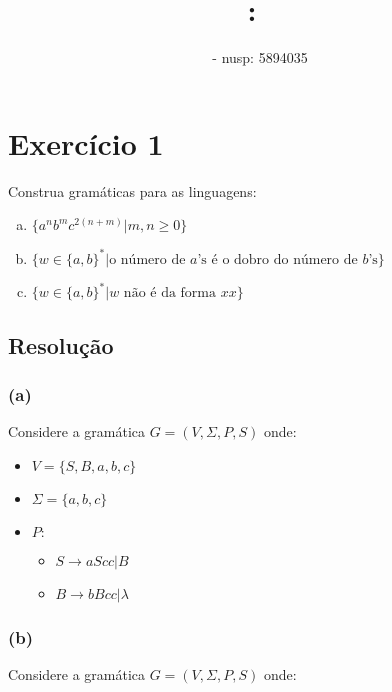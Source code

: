 \documentclass{article}
\title{
\textmd{\textbf{\hmwkClass:\ \hmwkTitle}}\\
}
\author{\textbf{\hmwkAuthorName} - nusp: 5894035}
\date{} %
\begin{document}
\maketitle


\section{Exercício 1}

Construa gramáticas para as linguagens:

\begin{enumerate}[(a)]
	\item $\{a^nb^mc^{2(n+m)}|m,n\geq 0\}$
	\item $\{w\in\{a,b\}^*|\text{o número de }a\text{'s é o dobro do número de }b\text{'s}\}$
	\item $\{w\in\{a,b\}^*|w\text{ não é da forma }xx\}$
\end{enumerate}

\subsection{Resolução}

\subsubsection{(a)}

Considere a gramática $G = (V, \Sigma, P, S)$ onde:

\begin{itemize}
	\item $V = \{S, B, a, b, c\}$
	\item $\Sigma = \{a, b, c\}$
	\item $P:$
	\begin{itemize}
		\item $S\rightarrow aScc | B$
		\item $B\rightarrow bBcc | \lambda$
	\end{itemize}
\end{itemize}


\subsubsection{(b)}

Considere a gramática $G = (V, \Sigma, P, S)$ onde:
\end{document}

